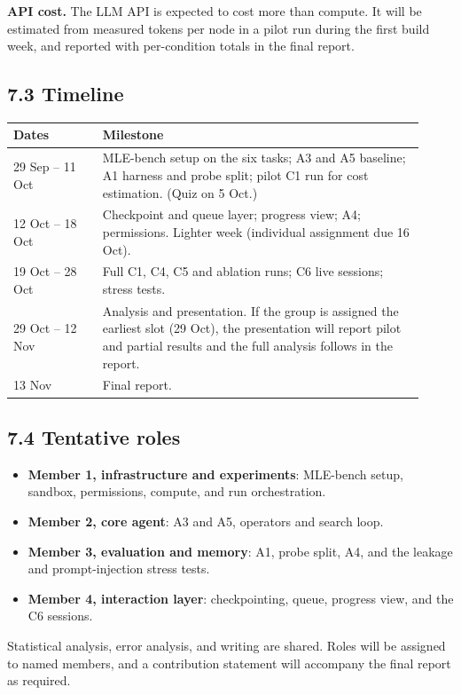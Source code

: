 \documentclass[11pt]{article}
\begin{document}
\textbf{API cost.} The LLM API is expected to cost more than compute. It will be
estimated from measured tokens per node in a pilot run during the first build week,
and reported with per-condition totals in the final report.

\subsection*{7.3 Timeline}

\begin{table}[H]
\centering
\small
\begin{tabular}{@{}p{0.20\linewidth}p{0.72\linewidth}@{}}
\toprule
\textbf{Dates} & \textbf{Milestone} \\
\midrule
29 Sep -- 11 Oct & MLE-bench setup on the six tasks; A3 and A5 baseline; A1 harness
  and probe split; pilot C1 run for cost estimation. (Quiz on 5 Oct.) \\
12 Oct -- 18 Oct & Checkpoint and queue layer; progress view; A4; permissions.
  Lighter week (individual assignment due 16 Oct). \\
19 Oct -- 28 Oct & Full C1, C4, C5 and ablation runs; C6 live sessions; stress tests.
  \\
29 Oct -- 12 Nov & Analysis and presentation. If the group is assigned the earliest
  slot (29 Oct), the presentation will report pilot and partial results and the
  full analysis follows in the report. \\
13 Nov & Final report. \\
\bottomrule
\end{tabular}
\end{table}

\subsection*{7.4 Tentative roles}

\begin{itemize}[leftmargin=*,itemsep=0.1em]
    \item \textbf{Member 1, infrastructure and experiments}: MLE-bench setup,
          sandbox, permissions, compute, and run orchestration.
    \item \textbf{Member 2, core agent}: A3 and A5, operators and search loop.
    \item \textbf{Member 3, evaluation and memory}: A1, probe split, A4, and the
          leakage and prompt-injection stress tests.
    \item \textbf{Member 4, interaction layer}: checkpointing, queue, progress view,
          and the C6 sessions.
\end{itemize}
Statistical analysis, error analysis, and writing are shared. Roles will be assigned
to named members, and a contribution statement will accompany the final report as
required.
\end{document}
